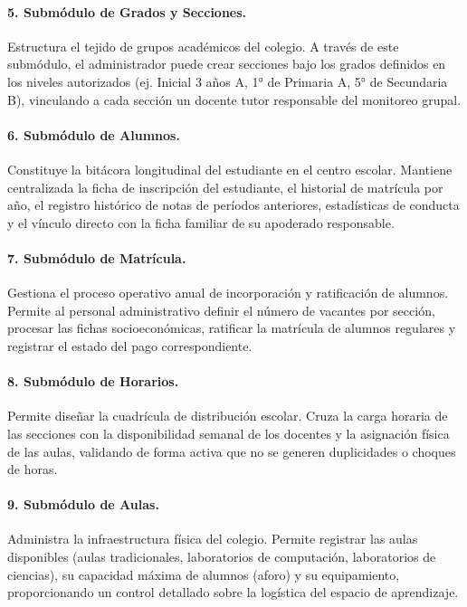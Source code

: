 \documentclass[12pt,a4paper,oneside]{report}
\begin{document}
\paragraph{5. Submódulo de Grados y Secciones.} Estructura el tejido de grupos académicos del colegio. A través de este submódulo, el administrador puede crear secciones bajo los grados definidos en los niveles autorizados (ej. Inicial 3 años A, 1° de Primaria A, 5° de Secundaria B), vinculando a cada sección un docente tutor responsable del monitoreo grupal.

\paragraph{6. Submódulo de Alumnos.} Constituye la bitácora longitudinal del estudiante en el centro escolar. Mantiene centralizada la ficha de inscripción del estudiante, el historial de matrícula por año, el registro histórico de notas de períodos anteriores, estadísticas de conducta y el vínculo directo con la ficha familiar de su apoderado responsable.

\paragraph{7. Submódulo de Matrícula.} Gestiona el proceso operativo anual de incorporación y ratificación de alumnos. Permite al personal administrativo definir el número de vacantes por sección, procesar las fichas socioeconómicas, ratificar la matrícula de alumnos regulares y registrar el estado del pago correspondiente.

\paragraph{8. Submódulo de Horarios.} Permite diseñar la cuadrícula de distribución escolar. Cruza la carga horaria de las secciones con la disponibilidad semanal de los docentes y la asignación física de las aulas, validando de forma activa que no se generen duplicidades o choques de horas.

\paragraph{9. Submódulo de Aulas.} Administra la infraestructura física del colegio. Permite registrar las aulas disponibles (aulas tradicionales, laboratorios de computación, laboratorios de ciencias), su capacidad máxima de alumnos (aforo) y su equipamiento, proporcionando un control detallado sobre la logística del espacio de aprendizaje.
\end{document}
